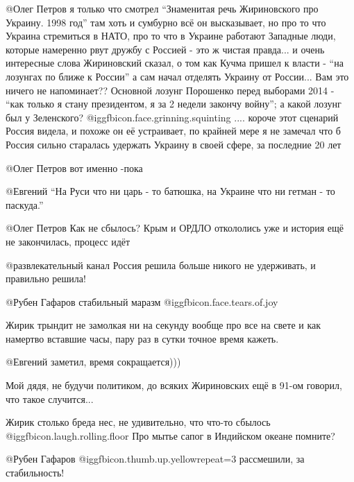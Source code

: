 \begin{itemize}
\begin{itemize}
@Олег Петров  я только что смотрел \enquote{Знаменитая речь Жириновского про Украину.
1998 год} там хоть и сумбурно всё он высказывает, но про то что Украина
стремиться в НАТО, про то что в Украине работают Западные люди, которые
намеренно рвут дружбу с Россией - это ж чистая правда... и очень интересные
слова Жириновский сказал, о том как Кучма пришел к власти - \enquote{на лозунгах по
ближе к России} а сам начал отделять Украину от России... Вам это ничего не
напоминает?? Основной лозунг Порошенко перед выборами 2014 - \enquote{как только я
стану президентом, я за 2 недели закончу войну}; а какой лозунг был у
Зеленского? @igg{fbicon.face.grinning.squinting} .... короче этот сценарий Россия видела, и похоже он её
устраивает, по крайней мере я не замечал что б Россия сильно старалась
удержать Украину в своей сфере, за последние 20 лет

 @Олег Петров  вот именно -пока


@Евгений  \enquote{На Руси что ни царь - то батюшка, на Украине что ни гетман - то
паскуда.}


@Олег Петров  Как не сбылось? Крым и ОРДЛО откололись уже и история ещё не
закончилась, процесс идёт


@развлекательный канал  Россия решила больше никого не удерживать, и правильно решила!

 @Рубен Гафаров  стабильный маразм @igg{fbicon.face.tears.of.joy} 


Жирик трындит не замолкая ни на секунду вообще про все на свете и как намертво
вставшие часы, пару раз в сутки точное время кажеть.


 @Евгений  заметил, время сокращается)))


Мой дядя, не будучи политиком, до всяких Жириновских ещё в 91-ом говорил, что
такое случится...



Жирик столько бреда нес, не удивительно, что что-то сбылось  @igg{fbicon.laugh.rolling.floor}  Про мытье сапог
в Индийском океане помните?


 @Рубен Гафаров   @igg{fbicon.thumb.up.yellow}{repeat=3}  рассмешили, за стабильность!



\end{itemize}
\end{itemize}
